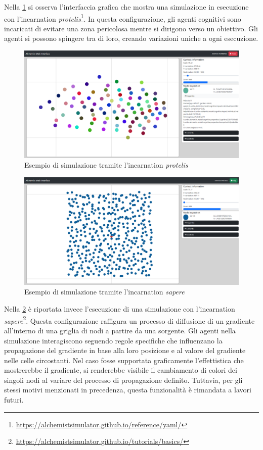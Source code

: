 Nella \cref{fig:protelis-example} si osserva l'interfaccia grafica che mostra una simulazione in esecuzione con l'incarnation \textit{protelis}\footnote{\url{https://alchemistsimulator.github.io/reference/yaml/}}. In questa configurazione, gli agenti cognitivi sono incaricati di evitare una zona pericolosa mentre si dirigono verso un obiettivo. Gli agenti si possono spingere tra di loro, creando variazioni uniche a ogni esecuzione.
\begin{figure}
	\centering
	\includegraphics[scale=0.22]{imgs/screens/example_protelis.png}
	\caption{Esempio di simulazione tramite l'incarnation \textit{protelis}}
	\label{fig:protelis-example}
\end{figure}
\begin{figure}
	\centering
	\includegraphics[scale=0.22]{imgs/screens/example_sapere.png}
	\caption{Esempio di simulazione tramite l'incarnation \textit{sapere}}
	\label{fig:sapere-example}
\end{figure}

Nella \cref{fig:sapere-example} è riportata invece l'esecuzione di una simulazione con l'incarnation \textit{sapere}\footnote{\url{https://alchemistsimulator.github.io/tutorials/basics/}}. Questa configurazione raffigura un processo di diffusione di un gradiente all'interno di una griglia di nodi a partire da una sorgente. Gli agenti nella simulazione interagiscono seguendo regole specifiche che influenzano la propagazione del gradiente in base alla loro posizione e al valore del gradiente nelle celle circostanti. 
Nel caso fosse supportata graficamente l'effettistica che mostrerebbe il gradiente, si renderebbe visibile il cambiamento di colori dei singoli nodi al variare del processo di propagazione definito. Tuttavia, per gli stessi motivi menzionati in precedenza, questa funzionalità è rimandata a lavori futuri.

